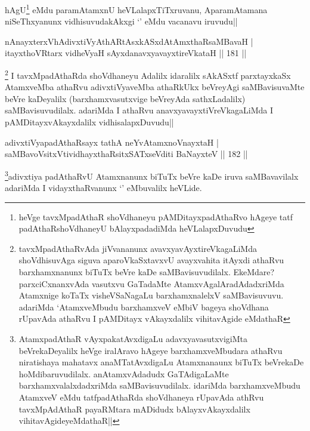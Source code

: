 \begin{artha}
hAgU\footnote[2]{heVge tavxMpadAthaR shoVdhaneyu pAMDitayxpadAthaRvo hAgeye tatf padAthaRshoVdhaneyU bAlayxpadadiMda heVLalapxDuvudu} eMdu paramAtamxnU heVLalapxTiTxruvanu, AparamAtamana niSeThxyanunx vidhisuvudakAkxgi `\stext ' eMdu vacanavu iruvudu||
\end{artha}

\begin{shl}
nAnayxterxVhAdivxtiVyAthARtAsxkASxdAtAmxthaRsaMBavaH |\\
itayxthoVR\s tarx vidheVyaH sAyxdanavxyavayxtireVkataH \hfill || 181 ||
\end{shl}

\begin{artha}%
\footnote[1]{tavxMpadAthaRvAda jiVvananunx avavxyavAyxtireVkagaLiMda shoVdhisuvAga siguva aparoVkaSxtavxvU avayxvahita itAyxdi athaRvu barxhamxnanunx biTuTx beVre kaDe saMBavisuvudilalx. EkeMdare? parxciCxnanxvAda vasutxvu GaTadaMte AtamxvAgalAradAdadxriMda Atamxnige koTaTx visheVSaNagaLu barxhamxnalelxV saMBavisuvuvu. adariMda `AtamxveMbudu barxhamxveV eMbiV bageya shoVdhana rUpavAda athaRvu I pAMDitayx vAkayxdalilx vihitavAgide eMdathaR} I tavxMpadAthaRda shoVdhaneyu Adalilx idaralilx sAkASxtf parxtayxkaSx AtamxveMba athaRvu adivxtiVyaveMba athaRkUkx beVreyAgi saMBavisuvaMte beVre kaDeyalilx (barxhamxvasutxvige beVreyAda sathxLadalilx) saMBavisuvudilalx. adariMda I athaRvu anavxyavayxtiVreVkagaLiMda I pAMDitayxvAkayxdalilx vidhisalapxDuvudu||
\end{artha}


\begin{shl}
adivxtiVyapadAthaRsayx tathA neYvA\s \s tamxnoV\s nayxtaH |\\
saMBavoV\s sitxVtividhayxthaRsitxSATxseVditi BaNayxteV \hfill || 182 ||
\end{shl}

\begin{artha}
\footnote[2]{AtamxpadAthaR vAyxpakatAvxdigaLu adavxyavasutxvigiMta beVrekaDeyalilx heVge iralAravo hAgeye barxhamxveMbudara athaRvu niratishaya mahatavx anaMTatAvxdigaLu Atamxnanaunx biTuTx beVrekaDe hoMdibaruvudilalx. anAtamxvAdadudx GaTAdigaLaMte barxhamxvalalxdadxriMda saMBavisuvudilalx. idariMda barxhamxveMbudu  AtamxveV eMdu tatfpadAthaRda shoVdhaneya rUpavAda athRvu tavxMpAdAthaR payaRMtara mADidudx bAlayxvAkayxdalilx vihitavAgideyeMdathaR||}adivxtiya padAthaRvU Atamxnanunx biTuTx beVre kaDe iruva saMBavavilalx adariMda I vidayxthaRvanunx `\stext ' eMbuvalilx heVLide.
\end{artha}

